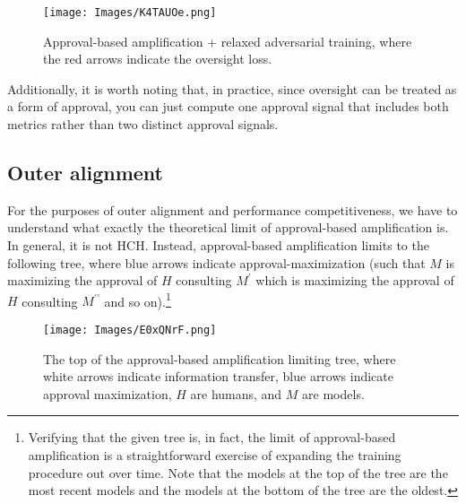 \documentclass[
  onecolumn,
  natbib,
]{miri-tech-article}
\begin{document}
\vspace{4mm}

\begin{figure}[h!]
  \centering
  \texttt{[image: Images/K4TAUOe.png]}
  \caption{Approval-based amplification + relaxed adversarial training, where the red arrows indicate the oversight loss.}
\end{figure}

\vspace{2mm}

\noindent Additionally, it is worth noting that, in practice, since oversight can be treated as a form of approval, you can just compute one approval signal that includes both metrics rather than two distinct approval signals.

\subsection{Outer alignment} For the purposes of outer alignment and performance competitiveness, we have to understand what exactly the theoretical limit of approval-based amplification is. In general, it is not HCH. Instead, approval-based amplification limits to the following tree, where blue arrows indicate approval-maximization (such that $M$ is maximizing the approval of $H$ consulting $M^\prime$ which is maximizing the approval of $H$ consulting $M^{\prime\prime}$ and so on).\footnote{Verifying that the given tree is, in fact, the limit of approval-based amplification is a straightforward exercise of expanding the training procedure out over time. Note that the models at the top of the tree are the most recent models and the models at the bottom of the tree are the oldest.}

\newpage

\vspace{4mm}

\begin{figure}[h!]
  \centering
  \texttt{[image: Images/E0xQNrF.png]}
  \caption{The top of the approval-based amplification limiting tree, where white arrows indicate information transfer, blue arrows indicate approval maximization, $H$ are humans, and $M$ are models.}
\end{figure}

\vspace{2mm}
\end{document}
